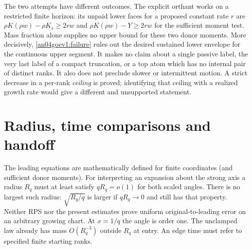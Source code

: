 \documentclass[11pt]{article}
\begin{document}
The two attempts have different outcomes. The explicit orthant
works on a restricted finite horizon: its unpaid lower faces for
a proposed constant rate \(r\) are
\(\rho K(\rho w)-\rho K_s\ge2rw\) and
\(\rho K(\rho w)-Y\ge2rw\) for the sufficient moment test.
Mass fraction alone supplies no upper bound for these two donor
moments. More decisively, \eqref{an04goev1:failure} rules out the
desired sustained lower envelope for the continuous upper segment.
It makes no claim about a single passive label, the very last
label of a compact truncation, or a top atom which has no internal
pair of distinct ranks. It also does not preclude slower or
intermittent motion. A strict decrease in a per-rank \emph{ceiling}
is proved; identifying that ceiling with a realized growth rate
would give a different and unsupported statement.

\section{Radius, time comparisons and handoff}\label{an04goev1:clock}
The leading equations are mathematically defined for finite
coordinates (and sufficient donor moments). For interpreting an
expansion about the strong axis a radius \(R_q\) must at least
satisfy \(qR_q=o(1)\) for both scaled angles. There is no largest
such radius: \(\sqrt{R_q/q}\) is larger if \(qR_q\to0\) and still
has that property. Neither RPS nor the present estimates prove
uniform original-to-leading error on an arbitrary growing chart.
At \(x\asymp1/q\) the angle is order one. The unclamped law already
has mass \(O(R_q^{-3})\) outside \(R_q\) at entry.
An edge time must refer to specified finite starting ranks.
\end{document}
